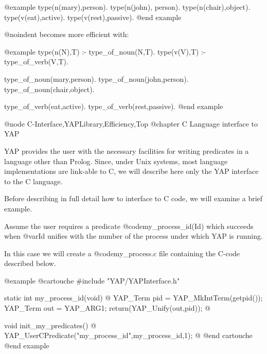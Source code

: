 {{{{{{{{@example
type(n(mary),person).
type(n(john), person).
type(n(chair),object).
type(v(eat),active).
type(v(rest),passive).
@end example

@noindent
 becomes more efficient with:

@example
type(n(N),T) :- type_of_noun(N,T).
type(v(V),T) :- type_of_verb(V,T).

type_of_noun(mary,person).
type_of_noun(john,person).
type_of_noun(chair,object).

type_of_verb(eat,active).
type_of_verb(rest,passive).
@end example

@node C-Interface,YAPLibrary,Efficiency,Top
@chapter C Language interface to YAP

YAP provides the user with the necessary facilities for writing
predicates in a language other than Prolog. Since, under Unix systems,
most language implementations are link-able to C, we will describe here
only the YAP interface to the C language.

Before describing in full detail how to interface to C code, we will examine 
a brief example.

Assume the user requires a predicate @code{my_process_id(Id)} which succeeds
when @var{Id} unifies with the number of the process under which YAP is running.

In this case we will create a @code{my_process.c} file containing the
C-code described below.

@example
@cartouche
#include "YAP/YAPInterface.h"

static int my_process_id(void) 
@{
     YAP_Term pid = YAP_MkIntTerm(getpid());
     YAP_Term out = YAP_ARG1;
     return(YAP_Unify(out,pid));
@}

void init_my_predicates()
@{
     YAP_UserCPredicate("my_process_id",my_process_id,1);
@}
@end cartouche
@end example

}}}}}}}}
